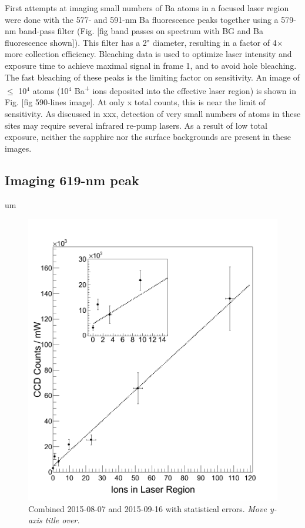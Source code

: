 First attempts at imaging small numbers of Ba atoms in a focused laser region were done with the 577- and 591-nm Ba fluorescence peaks together using a {\color{red}579-nm} band-pass filter (Fig. [fig band passes on spectrum with BG and Ba fluorescence shown]).  This filter has a 2" diameter, resulting in a factor of 4$\times$ more collection efficiency.  Bleaching data is used to optimize laser intensity and exposure time to achieve maximal signal in frame 1, and to avoid hole bleaching.  The fast bleaching of these peaks is the limiting factor on sensitivity.  An image of $\leq$ 10$^{4}$ atoms (10$^{4}$ Ba\textsuperscript{+} ions deposited into the effective laser region) is shown in Fig. [fig 590-lines image].  At only x total counts, this is near the limit of sensitivity.  As discussed in xxx, detection of very small numbers of atoms in these sites may require several infrared re-pump lasers.  As a result of low total exposure, neither the sapphire nor the surface backgrounds are present in these images.

\subsection{Imaging 619-nm peak}

um

\begin{figure} %
        \centering
                \includegraphics[width=.7\textwidth]{figures/fitgrouped_20150807_20150916_inset.png}
                \caption{Combined 2015-08-07 and 2015-09-16 with statistical errors.  \emph{\color{gray}Move y-axis title over.}}
\label{fig:lin}
\end{figure}

